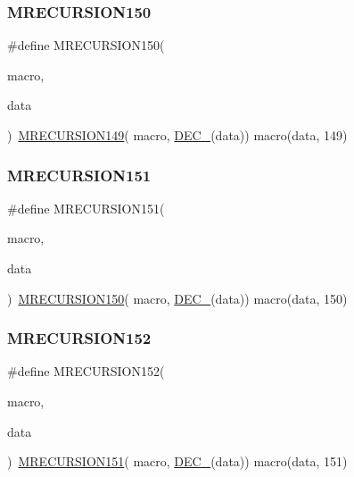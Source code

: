 \subsubsection{\texorpdfstring{MRECURSION150}{MRECURSION150}}
{\footnotesize\ttfamily \#define M\+R\+E\+C\+U\+R\+S\+I\+O\+N150(\begin{DoxyParamCaption}\item[{}]{macro,  }\item[{}]{data }\end{DoxyParamCaption})~\mbox{\hyperlink{group__group__sam0__utils__mrecursion_ga6d1a3c19222c7ee8771101e98a959fb7}{M\+R\+E\+C\+U\+R\+S\+I\+O\+N149}}(  macro, \mbox{\hyperlink{group__group__sam0__utils__mrecursion_ga1d23d683797679dca8c3512a54a5dcae}{D\+E\+C\+\_\+}}(data))   macro(data, 149)}

\mbox{\label{group__group__sam0__utils__mrecursion_gafbbfc4f5157baa8750ce7782323a9f5a}} 
\subsubsection{\texorpdfstring{MRECURSION151}{MRECURSION151}}
{\footnotesize\ttfamily \#define M\+R\+E\+C\+U\+R\+S\+I\+O\+N151(\begin{DoxyParamCaption}\item[{}]{macro,  }\item[{}]{data }\end{DoxyParamCaption})~\mbox{\hyperlink{group__group__sam0__utils__mrecursion_gabb9799f7a5fef3fb5fa69e1bef4ff318}{M\+R\+E\+C\+U\+R\+S\+I\+O\+N150}}(  macro, \mbox{\hyperlink{group__group__sam0__utils__mrecursion_ga1d23d683797679dca8c3512a54a5dcae}{D\+E\+C\+\_\+}}(data))   macro(data, 150)}

\mbox{\label{group__group__sam0__utils__mrecursion_ga06ffc91df193dcdab63b568718773b02}} 
\subsubsection{\texorpdfstring{MRECURSION152}{MRECURSION152}}
{\footnotesize\ttfamily \#define M\+R\+E\+C\+U\+R\+S\+I\+O\+N152(\begin{DoxyParamCaption}\item[{}]{macro,  }\item[{}]{data }\end{DoxyParamCaption})~\mbox{\hyperlink{group__group__sam0__utils__mrecursion_gafbbfc4f5157baa8750ce7782323a9f5a}{M\+R\+E\+C\+U\+R\+S\+I\+O\+N151}}(  macro, \mbox{\hyperlink{group__group__sam0__utils__mrecursion_ga1d23d683797679dca8c3512a54a5dcae}{D\+E\+C\+\_\+}}(data))   macro(data, 151)}

